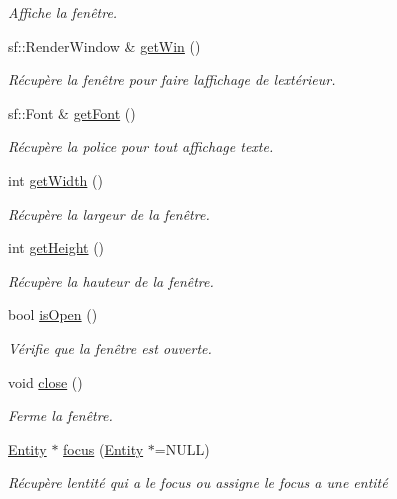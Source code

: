 \begin{DoxyCompactItemize}
\begin{DoxyCompactList}\small\item\em Affiche la fenêtre. \end{DoxyCompactList}\item 
sf\+::\+Render\+Window \& \hyperlink{class_s_render_a949243a32970a5c32c39f93fe7faa748}{get\+Win} ()
\begin{DoxyCompactList}\small\item\em Récupère la fenêtre pour faire l\textquotesingle{}affichage de l\textquotesingle{}extérieur. \end{DoxyCompactList}\item 
sf\+::\+Font \& \hyperlink{class_s_render_a6461c9bef628ee214809e1505b2e482d}{get\+Font} ()
\begin{DoxyCompactList}\small\item\em Récupère la police pour tout affichage texte. \end{DoxyCompactList}\item 
int \hyperlink{class_s_render_a8bf7839630aa1555153a6e6e0739ed7f}{get\+Width} ()
\begin{DoxyCompactList}\small\item\em Récupère la largeur de la fenêtre. \end{DoxyCompactList}\item 
int \hyperlink{class_s_render_aed0673771015a6467d575c89da5b972d}{get\+Height} ()
\begin{DoxyCompactList}\small\item\em Récupère la hauteur de la fenêtre. \end{DoxyCompactList}\item 
bool \hyperlink{class_s_render_a4dc6db44efd4eb24ba2db8c31b98b0e2}{is\+Open} ()
\begin{DoxyCompactList}\small\item\em Vérifie que la fenêtre est ouverte. \end{DoxyCompactList}\item 
\hypertarget{class_s_render_a777ee3dfec5504d0dd8070fbd8ed32f8}{}void \hyperlink{class_s_render_a777ee3dfec5504d0dd8070fbd8ed32f8}{close} ()\label{class_s_render_a777ee3dfec5504d0dd8070fbd8ed32f8}

\begin{DoxyCompactList}\small\item\em Ferme la fenêtre. \end{DoxyCompactList}\item 
\hyperlink{class_entity}{Entity} $\ast$ \hyperlink{class_s_render_a23e295644f80582d082c75a77a258e9c}{focus} (\hyperlink{class_entity}{Entity} $\ast$=N\+U\+L\+L)
\begin{DoxyCompactList}\small\item\em Récupère l\textquotesingle{}entité qui a le focus ou assigne le focus a une entité \end{DoxyCompactList}\end{DoxyCompactItemize}


